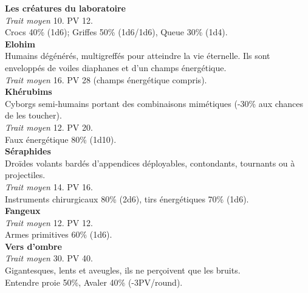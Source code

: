 \documentclass[11pt,twoside,a4paper]{book}
\begin{document}
\textbf{Les cr{\'e}atures du laboratoire}~\\
\emph{Trait moyen} 10. PV 12.~\\
Crocs 40\% (1d6); Griffes 50\% (1d6/1d6), Queue 30\% (1d4).~\\


\textbf{Elohim}~\\
Humains d{\'e}g{\'e}n{\'e}r{\'e}s, multigreff{\'e}s pour atteindre la vie {\'e}ternelle. Ils sont envelopp{\'e}s de voiles diaphanes et d'un champs {\'e}nerg{\'e}tique.~\\
\emph{Trait moyen} 16. PV 28 (champs {\'e}nerg{\'e}tique compris).~\\

\textbf{Kh{\'e}rubims}~\\
Cyborgs semi-humains portant des combinaisons mim{\'e}tiques (-30\% aux chances de les toucher).~\\
\emph{Trait moyen} 12. PV 20.~\\
Faux {\'e}nerg{\'e}tique 80\% (1d10).~\\

\textbf{S{\'e}raphides}~\\
Dro{\"i}des volants bard{\'e}s d'appendices d{\'e}ployables, contondants, tournants ou {\`a} projectiles.~\\
\emph{Trait moyen} 14. PV 16.~\\
Instruments chirurgicaux 80\% (2d6), tirs {\'e}nerg{\'e}tiques 70\% (1d6).~\\

\textbf{Fangeux}~\\
\emph{Trait moyen} 12. PV 12.~\\
Armes primitives 60\% (1d6).~\\

\textbf{Vers d'ombre}~\\
\emph{Trait moyen} 30. PV 40.~\\
Gigantesques, lents et aveugles, ils ne per\c{c}oivent que les bruits.~\\
Entendre proie 50\%, Avaler 40\% (-3PV/round).~\\

\clearpage

\end{document}
